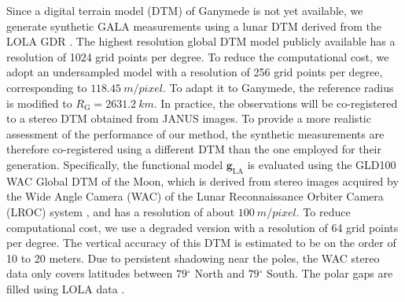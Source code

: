 \documentclass[pdflatex,sn-mathphys-num]{sn-jnl}%
\newcommand{\degr}{\ensuremath{^\circ}}
\theoremstyle{thmstyleone}%
\theoremstyle{thmstyletwo}%
\theoremstyle{thmstylethree}%
\begin{document}
Since a digital terrain model (DTM) of Ganymede is not yet available, we generate synthetic GALA measurements using a lunar DTM derived from the LOLA GDR \citep{Neumann2014LOLA_GDR}. 
The highest resolution global DTM model publicly available has a resolution of 1024 grid points per degree. To reduce the computational cost, we adopt an undersampled model with a resolution of 256 grid points per degree, corresponding to $\SI{118.45}{m/pixel}$. To adapt it to Ganymede, the reference radius is modified to $R_{\mathrm{G}} = \SI{2631.2}{km}$.
%
In practice, the observations will be co-registered to a stereo DTM obtained from JANUS images. To provide a more realistic assessment of the performance of our method, the synthetic measurements are therefore co-registered using a different DTM than the one employed for their generation. Specifically, the functional model $\boldsymbol{g}_{\mathrm{LA}}$ is evaluated using the GLD100 WAC Global DTM of the Moon, which is derived from stereo images acquired by the Wide Angle Camera (WAC) of the Lunar Reconnaissance Orbiter Camera (LROC) system \citep{2012JGRE..117.0H17S}, and has a resolution of about $\SI{100}{m/pixel}$. To reduce computational cost, we use a degraded version with a resolution of 64 grid points per degree. The vertical accuracy of this DTM is estimated to be on the order of 10 to 20 meters. Due to persistent shadowing near the poles, the WAC stereo data only covers latitudes between $79\degr$ North and $79\degr$ South. The polar gaps are filled using LOLA data \citep{2010GeoRL..3718204S}.
\end{document}
